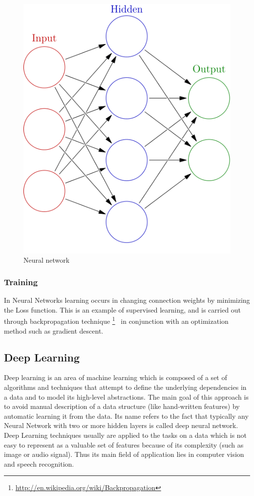 \documentclass[a4paper,oneside,dvipsnames]{article}
\begin{document}
\begin{figure}[h]
    \centering
    \includegraphics[scale=0.39]{450px-Colored_neural_network.png}
    \caption{Neural network}
    \label{fig:awesome_image}
\end{figure}


\subsubsection[Training]{Training}
In Neural Networks learning occurs in changing connection weights by minimizing the Loss function. This is an example of supervised learning, and is carried out through backpropagation technique
\footnote{\url{http://en.wikipedia.org/wiki/Backpropagation}}
\ in conjunction with an optimization method such as gradient descent.

\subsection[Deep Learning]{Deep Learning}
Deep learning is an area of machine learning which is composed of a set of algorithms and techniques that attempt to define the underlying dependencies in a data and to model its high-level abstractions. The main goal of this approach is to avoid manual description of a data structure (like hand-written features) by automatic learning it from the data. Its name refers to the fact that typically any Neural Network with two or more hidden layers is called deep neural network. Deep Learning techniques usually are applied to the tasks on a data which is not easy to represent as a valuable set of features because of its complexity (such as image or audio signal). Thus its main field of application lies in computer vision and speech recognition.
\end{document}
